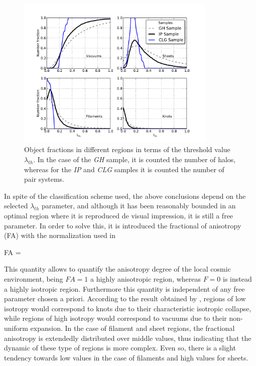 \
\begin{figure}[htbp]
	\centering
	\includegraphics[trim = 8mm 5mm 12mm 12mm, clip, width=0.85\textwidth]
	{./figures/4_results/CLG_Classification_Env.pdf}
	
	\caption{\small{Object fractions in different regions in terms of the
	threshold value $\lambda_{th}$. In the case of the \textit{GH} sample,
	it is counted the number of halos, whereas for the \textit{IP} and 
	\textit{CLG} samples it is counted the number of pair systems.}}
	\label{fig:Samples_Fraction}
\end{figure}


In spite of the classification scheme used, the above conclusions depend
on the selected $\lambda_{th}$ parameter, and although it has been 
reasonably bounded in an optimal region where it is reproduced de visual
impression, it is still a free parameter. In order to solve this, it is 
introduced the fractional of anisotropy (FA) with the normalization used
in \cite{libeskind2013}


{ FA = \sqrt{ \frac{ (\lambda_1 - \lambda_3)^2 + 
(\lambda_2 - \lambda_3)^2 + (\lambda_1 - \lambda_2)^2}{ \lambda_1^2 + 
\lambda_2^2 + \lambda_3^2} } }


This quantity allows to quantify the anisotropy degree of the local cosmic
environment, being $FA=1$ a highly anisotropic region, whereas $F=0$ is 
instead a highly isotropic region. Furthermore this quantity is independent
of any free parameter chosen a priori. According to the result obtained by
\cite{libeskind2013}, regions of low isotropy would correspond to knots 
due to their characteristic isotropic collapse, while regions of high 
isotropy would correspond to vacuums due to their non-uniform expansion. 
In the case of filament and sheet regions, the fractional anisotropy is 
extendedly distributed over middle values, thus indicating that the 
dynamic of these type of regions is more complex. Even so, there is a 
slight tendency towards low values in the case of filaments and high 
values for sheets.


